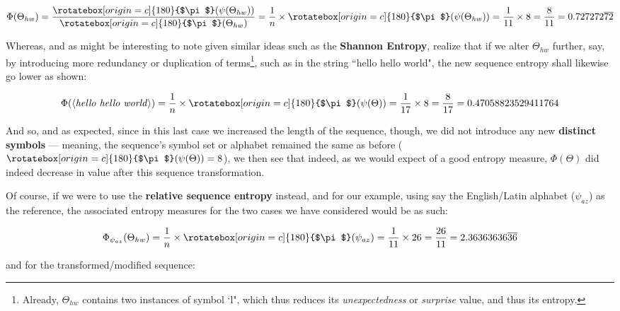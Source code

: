 \documentclass[a4paper, 18pt]{book} %
\newcommand{\invpi}{\rotatebox[origin=c]{180}{$\pi$}}
\begin{document}
\begin{appendices}
\vspace{1em}
\begin{equation}
\Phi(\Theta_{hw}) = \frac{\invpi(\psi(\Theta_{hw}))}{\invpi(\Theta_{hw})} = \frac{1}{n} \times \invpi(\psi(\Theta_{hw})) = \frac{1}{11} \times 8 = \frac{8}{11} = 0.727272\overline{72}
\end{equation}
\vspace{1em}

Whereas, and as might be interesting to note given similar ideas such as the \textbf{Shannon Entropy}\cite{shannon1948mathematical}, realize that if we alter $\Theta_{hw}$ further, say, by introducing more redundancy or duplication of terms\footnote{Already, $\Theta_{hw}$ contains two instances of symbol `l", which thus reduces its \textit{unexpectedness} or \textit{surprise} value, and thus its entropy.}, such as in the string ``hello hello world", the new sequence entropy shall likewise go lower as shown:

\vspace{1em}
\begin{equation}
\Phi(\langle \text{\textit{hello hello world}} \rangle) = \frac{1}{n} \times \invpi(\psi(\Theta)) = \frac{1}{17} \times 8 = \frac{8}{17} = 0.47058823529411764
\end{equation}
\vspace{1em}


And so, and as expected, since in this last case we increased the length of the sequence, though, we did not introduce any new \textbf{distinct symbols} --- meaning, the sequence's symbol set or alphabet remained the same as before ($\invpi(\psi(\Theta)) = 8$), we then see that indeed, as we would expect of a good entropy measure, $\Phi(\Theta)$ did indeed decrease in value after this sequence transformation.

Of course, if we were to use the \textbf{relative sequence entropy} instead, and for our example, using say the English/Latin alphabet ($\psi_{az}$) as the reference, the associated entropy measures for the two cases we have considered would be as such:

\vspace{1em}
\begin{equation}
\Phi_{\psi_{az}}(\Theta_{hw}) = \frac{1}{n} \times \invpi(\psi_{az}) = \frac{1}{11} \times 26 = \frac{26}{11} = 2.36363636\overline{36}
\end{equation}
\vspace{1em}

and for the transformed/modified sequence:


\end{appendices}
\end{document}
